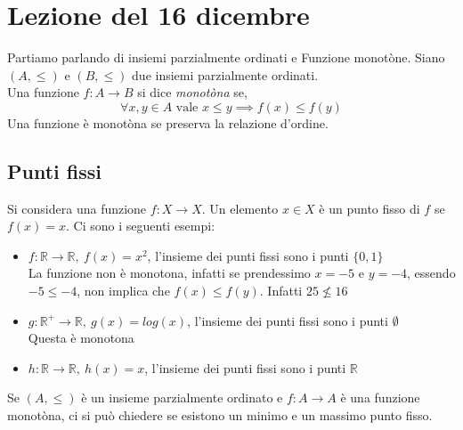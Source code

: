 \section{Lezione del 16 dicembre}
Partiamo parlando di insiemi parzialmente ordinati e Funzione monotòne. Siano $(A, \leq)$ e $(B, \leq)$ due insiemi parzialmente ordinati.\\ 
Una funzione $f : A \to B$ si dice \textit{monotòna} se, \[\forall x, y \in A \mbox{ vale }x \leq y \implies f(x) \leq f(y)\]
Una funzione è monotòna se preserva la relazione d’ordine.

\subsection{Punti fissi}
Si considera una funzione $f : X \to X$. Un elemento $x \in X$ è un punto fisso di $f$ se $f(x) = x$.
Ci sono i seguenti esempi:
\begin{itemize}
    \item $f: \mathbb{R} \to  \mathbb{R}, \ f(x) = x^2$, l'insieme dei punti fissi sono i punti $\{0,1\}$\\
    La funzione non è monotona, infatti se prendessimo $x= -5$ e $y=-4$, essendo $-5 \leq -4$, non implica che $f(x) \leq f(y)$. Infatti $25 \nleq 16$
    \item $g: \mathbb{R}^+ \to  \mathbb{R}, \ g(x) = log(x)$, l'insieme dei punti fissi sono i punti $\emptyset$\\
    Questa è monotona
    \item $h: \mathbb{R} \to  \mathbb{R}, \ h(x) = x$, l'insieme dei punti fissi sono i punti $\mathbb{R}$\\
    
\end{itemize}

Se $(A, \leq)$ è un insieme parzialmente ordinato e $f:A \to A$ è una funzione monotòna, ci si può chiedere se esistono un minimo e un massimo punto fisso.\\

